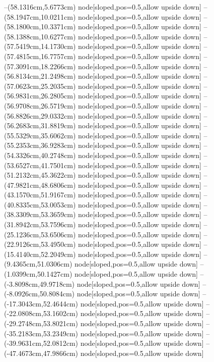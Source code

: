 --(58.1316cm,5.6773cm) node[sloped,pos=0.5,allow upside down]{\arrowIn}
--(58.1947cm,10.0211cm) node[sloped,pos=0.5,allow upside down]{\ArrowIn}
--(58.1800cm,10.3371cm) node[sloped,pos=0.5,allow upside down]{\arrowIn}
--(58.1388cm,10.6277cm) node[sloped,pos=0.5,allow upside down]{\arrowIn}
--(57.5419cm,14.1730cm) node[sloped,pos=0.5,allow upside down]{\ArrowIn}
--(57.4815cm,16.7757cm) node[sloped,pos=0.5,allow upside down]{\ArrowIn}
--(57.3091cm,18.2266cm) node[sloped,pos=0.5,allow upside down]{\ArrowIn}
--(56.8134cm,21.2498cm) node[sloped,pos=0.5,allow upside down]{\ArrowIn}
--(57.0623cm,25.2035cm) node[sloped,pos=0.5,allow upside down]{\ArrowIn}
--(56.9831cm,26.2805cm) node[sloped,pos=0.5,allow upside down]{\ArrowIn}
--(56.9708cm,26.5719cm) node[sloped,pos=0.5,allow upside down]{\arrowIn}
--(56.8826cm,29.0332cm) node[sloped,pos=0.5,allow upside down]{\ArrowIn}
--(56.2683cm,31.8819cm) node[sloped,pos=0.5,allow upside down]{\ArrowIn}
--(55.5329cm,35.6062cm) node[sloped,pos=0.5,allow upside down]{\ArrowIn}
--(55.2353cm,36.9283cm) node[sloped,pos=0.5,allow upside down]{\ArrowIn}
--(54.3326cm,40.2748cm) node[sloped,pos=0.5,allow upside down]{\ArrowIn}
--(53.6527cm,41.7501cm) node[sloped,pos=0.5,allow upside down]{\ArrowIn}
--(51.2132cm,45.3622cm) node[sloped,pos=0.5,allow upside down]{\ArrowIn}
--(47.9821cm,48.6806cm) node[sloped,pos=0.5,allow upside down]{\ArrowIn}
--(43.1570cm,51.9167cm) node[sloped,pos=0.5,allow upside down]{\ArrowIn}
--(40.8335cm,53.0053cm) node[sloped,pos=0.5,allow upside down]{\ArrowIn}
--(38.3309cm,53.3659cm) node[sloped,pos=0.5,allow upside down]{\ArrowIn}
--(31.8942cm,53.7596cm) node[sloped,pos=0.5,allow upside down]{\ArrowIn}
--(25.1236cm,53.6506cm) node[sloped,pos=0.5,allow upside down]{\ArrowIn}
--(22.9126cm,53.4950cm) node[sloped,pos=0.5,allow upside down]{\ArrowIn}
--(15.4140cm,52.2049cm) node[sloped,pos=0.5,allow upside down]{\ArrowIn}
--(9.4365cm,51.0306cm) node[sloped,pos=0.5,allow upside down]{\ArrowIn}
--(1.0399cm,50.1427cm) node[sloped,pos=0.5,allow upside down]{\ArrowIn}
--(-3.8098cm,49.9718cm) node[sloped,pos=0.5,allow upside down]{\ArrowIn}
--(-8.0926cm,50.8084cm) node[sloped,pos=0.5,allow upside down]{\ArrowIn}
--(-17.3043cm,52.4644cm) node[sloped,pos=0.5,allow upside down]{\ArrowIn}
--(-22.0808cm,53.1602cm) node[sloped,pos=0.5,allow upside down]{\ArrowIn}
--(-29.2748cm,53.8021cm) node[sloped,pos=0.5,allow upside down]{\ArrowIn}
--(-35.2183cm,53.2349cm) node[sloped,pos=0.5,allow upside down]{\ArrowIn}
--(-39.9631cm,52.0812cm) node[sloped,pos=0.5,allow upside down]{\ArrowIn}
--(-47.4673cm,47.9866cm) node[sloped,pos=0.5,allow upside down]{\ArrowIn}
